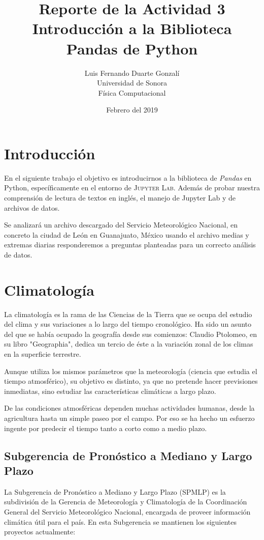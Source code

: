 \documentclass{article}
\title{\textbf{Reporte de la Actividad 3}\\ Introducción a la Biblioteca Pandas de Python}
\author{Luis Fernando Duarte Gonzalí \\ Universidad de Sonora \\ Física Computacional}
\date{Febrero del 2019}
\begin{document}
\maketitle


\section{Introducción}

\noindent En el siguiente trabajo el objetivo es introducirnos a la biblioteca de \textit{Pandas} en Python, específicamente en el entorno de \textsc{Jupyter Lab}. Además de probar nuestra comprensión de lectura de textos en inglés, el manejo de Jupyter Lab y de archivos de datos.

Se analizará un archivo descargado del Servicio Meteorológico Nacional, en concreto la ciudad de León en Guanajuato, México usando el archivo medias y extremas diarias responderemos a preguntas planteadas para un correcto análisis de datos.

\section{Climatología}

La climatología es la rama de las Ciencias de la Tierra que se ocupa del estudio del clima y sus variaciones a lo largo del tiempo cronológico. Ha sido un asunto del que se había ocupado la geografía desde sus comienzos: Claudio Ptolomeo, en su libro "Geographia", dedica un tercio de éste a la variación zonal de los climas en la superficie terrestre.

Aunque utiliza los mismos parámetros que la meteorología (ciencia que estudia el tiempo atmosférico), su objetivo es distinto, ya que no pretende hacer previsiones inmediatas, sino estudiar las características climáticas a largo plazo.

De las condiciones atmosféricas dependen muchas actividades humanas, desde la agricultura hasta un simple paseo por el campo. Por eso se ha hecho un esfuerzo ingente por predecir el tiempo tanto a corto como a medio plazo.

\subsection{Subgerencia de Pronóstico a Mediano y Largo Plazo}

La Subgerencia de Pronóstico a Mediano y Largo Plazo (SPMLP) es la subdivisión de la Gerencia de Meteorología y Climatología de la Coordinación General del Servicio Meteorológico Nacional, encargada de proveer información climática útil para el país. En esta Subgerencia se mantienen los siguientes proyectos actualmente:
\end{document}
